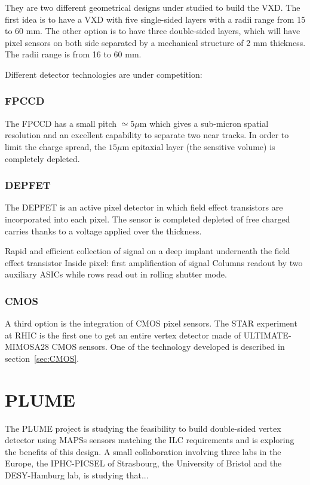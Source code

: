    They are two different geometrical designs under studied to build the \gls{VXD}. 
   The first idea is to have a \gls{VXD} with five single-sided layers with a radii range from 15 to 60 mm.
   The other option is to have three double-sided layers, which will have pixel sensors on both side separated by a mechanical structure of 2 mm thickness. 
   The radii range is from 16 to 60 mm.
    
   Different detector technologies are under competition:

   \subsubsection{FPCCD}
   The \gls{FPCCD} has a small pitch {$\simeq 5 \mu\text{m}$} which gives a sub-micron spatial resolution and an excellent capability to separate two near tracks.
   In order to limit the charge spread, the $15 \mu\text{m}$ epitaxial layer (the sensitive volume) is completely depleted.

   \subsubsection{DEPFET}
    
    The \gls{DEPFET} is an active pixel detector in which field effect transistors are incorporated into each pixel.
    The sensor is completed depleted of free charged carries thanks to a voltage applied over the thickness.

    Rapid and efficient collection of signal on a deep implant underneath the field effect transistor
    Inside pixel: first amplification of signal
    Columns readout by two auxiliary \glspl{ASIC} while rows read out in rolling shutter mode.

   \subsubsection{CMOS}

   A third option is the integration of \gls{CMOS} pixel sensors. 
   The STAR experiment at RHIC is the first one to get an entire vertex detector made of ULTIMATE-MIMOSA28 CMOS sensors.
   One of the technology developed is described in section~\ref{sec:CMOS}.

  \section{PLUME}


  The \gls{PLUME} project is studying the feasibility to build double-sided vertex detector using \glspl{MAPS} sensors matching the \gls{ILC} requirements and is exploring the benefits of this design.
  A small collaboration involving three labs in the Europe, the IPHC-PICSEL of Strasbourg, the University of Bristol and the DESY-Hamburg lab, is studying that...

